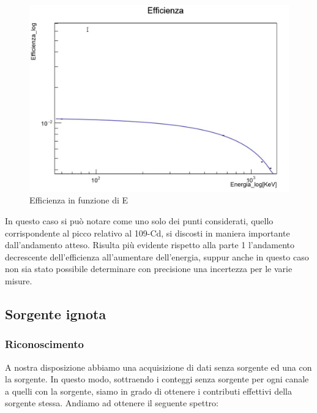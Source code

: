 \documentclass[a4paper,10pt]{article}
\begin{document}
\begin{figure}[H]
    \centering
    \includegraphics[scale=0.45]{grafici/efficienzamultigamma}
    \caption{Efficienza in funzione di E}
\end{figure}

\noindent In questo caso si pu\`o notare come uno solo dei punti considerati, quello corrispondente al picco relativo al 109-Cd, si discosti in maniera importante dall'andamento atteso. Risulta pi\`u evidente rispetto alla parte 1 l'andamento decrescente dell'efficienza all'aumentare dell'energia, suppur anche in questo caso non sia stato possibile determinare con precisione una incertezza per le varie misure.

\subsection{Sorgente ignota}


\subsubsection{Riconoscimento}
A nostra disposizione abbiamo una acquisizione di dati senza sorgente ed una con la sorgente. In questo modo, sottraendo i conteggi senza sorgente per ogni canale a quelli con la sorgente, siamo in grado di ottenere i contributi effettivi della sorgente stessa. Andiamo ad ottenere il seguente spettro:
\end{document}
